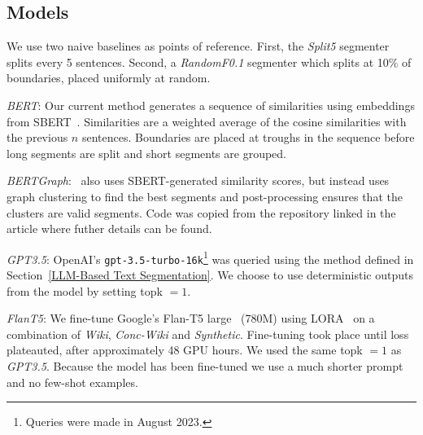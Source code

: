 \subsection{Models}

We use two naive baselines as points of reference. First, the \emph{Split5} segmenter splits every 5 sentences. Second, a \emph{RandomF0.1} segmenter which splits at 10\% of boundaries, placed uniformly at random.

\emph{BERT}: Our current method generates a sequence of similarities using embeddings from SBERT~\cite{SentenceBERT}. Similarities are a weighted average of the cosine similarities with the previous $n$ sentences. Boundaries are placed at troughs in the sequence before long segments are split and short segments are grouped.

\emph{BERTGraph}:~\cite{MasimilianoSegmenter} also uses SBERT-generated similarity scores, but instead uses graph clustering to find the best segments and post-processing ensures that the clusters are valid segments. Code was copied from the repository linked in the article where futher details can be found.

\emph{GPT3.5}\label{GPT3.5}: OpenAI's \texttt{gpt-3.5-turbo-16k}\footnote{Queries were made in August 2023.} was queried using the method defined in Section~\ref{LLM-Based Text Segmentation}. We choose to use deterministic outputs from the model by setting topk $=1$. 

\emph{FlanT5}\label{FlanT5}: We fine-tune Google's Flan-T5 large~\citep{FlanT5} (780M) using LORA~\citep{LORA} on a combination of \emph{Wiki}, \emph{Conc-Wiki} and \emph{Synthetic}. Fine-tuning took place until loss plateauted, after approximately 48 GPU hours. We used the same topk $=1$ as \emph{GPT3.5}. Because the model has been fine-tuned we use a much shorter prompt and no few-shot examples.